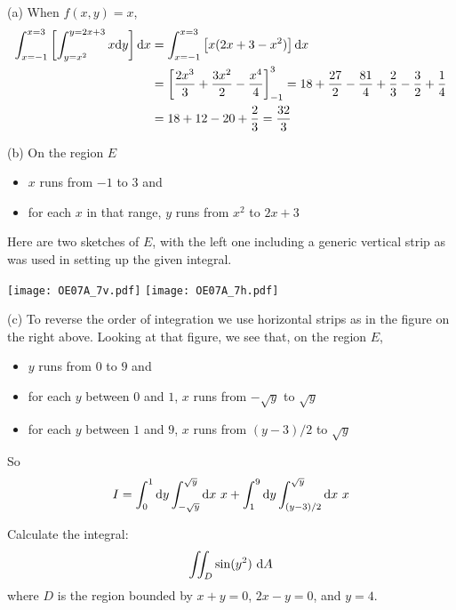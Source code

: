 \begin{solution}
(a) When $f(x,y)=x$,
\begin{align*}
\int_{x=-1}^{x=3}\left[\int_{y=x^2}^{y=2x+3} x \mathrm{d}y\right] \mathrm{d}x
&= \int_{x=-1}^{x=3}\left[x(2x+3-x^2) \right] \mathrm{d}x \\
&=\left[\frac{2x^3}{3}+\frac{3x^2}{2}-\frac{x^4}{4}\right]_{-1}^3
=18+\frac{27}{2}-\frac{81}{4} +\frac{2}{3}-\frac{3}{2}+\frac{1}{4} \\
&=18+12-20+\frac{2}{3}
=\frac{32}{3}
\end{align*}

(b) On the region $E$
\begin{itemize}
\item
 $x$ runs from $-1$ to $3$ and
\item
 for each $x$ in that range, $y$ runs from $x^2$ to $2x+3$
\end{itemize}
Here are two sketches of $E$, with the left one including a generic 
vertical strip as was used in setting up the given integral.
\begin{center}
     \texttt{[image: OE07A\_7v.pdf]}\qquad
     \texttt{[image: OE07A\_7h.pdf]}
\end{center}

(c) To reverse the order of integration we use horizontal strips
as in the figure on the right above. Looking at that figure, we see that,
on the region $E$,
\begin{itemize}
\item
 $y$ runs from $0$ to $9$ and
\item
 for each $y$ between $0$ and $1$, $x$ runs from $-\sqrt{y}$ to $\sqrt{y}$
\item
 for each $y$ between $1$ and $9$, $x$ runs from $(y-3)/2$ to $\sqrt{y}$
\end{itemize}
So
\begin{align*}
I = \int_0^1\mathrm{d}y \int_{-\sqrt{y}}^{\sqrt{y}}\mathrm{d}x\ x
    +\int_1^9\mathrm{d}y \int_{(y-3)/2}^{\sqrt{y}}\mathrm{d}x\ x
\end{align*}
\end{solution}

\begin{question}[M200 2008A] %
Calculate the integral:
\begin{equation*}
\iint_D \sin(y^2)\ \mathrm{d}A
\end{equation*}
where $D$ is the region bounded by $x + y = 0$, $2x - y = 0$, and $y = 4$.
\end{question}

